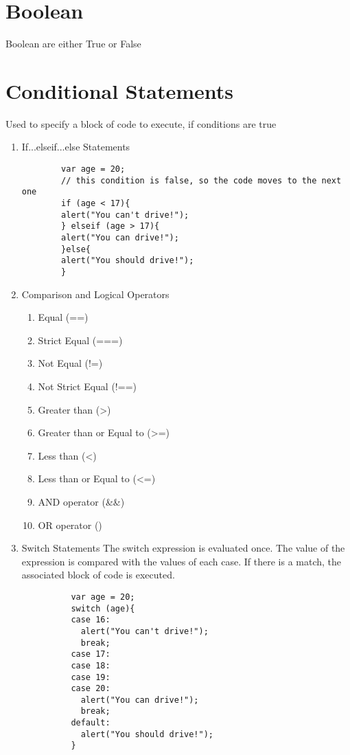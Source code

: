 \documentclass{article}
\begin{document}
  \section{Boolean}
  Boolean are either True or False
  \section{Conditional Statements}
  Used to specify a block of code to execute, if conditions are true
    \begin{enumerate}
      \item If...elseif...else Statements
      \begin{lstlisting}
        var age = 20;
        // this condition is false, so the code moves to the next one
        if (age < 17){
        alert("You can't drive!");
        } elseif (age > 17){
        alert("You can drive!");
        }else{
        alert("You should drive!");
        }
      \end{lstlisting}
      \item Comparison and Logical Operators
      \begin{enumerate}
        \item Equal (==)
        \item Strict Equal (===)
        \item Not Equal (!=)
        \item Not Strict Equal (!==)
        \item Greater than (\textgreater)
        \item Greater than or Equal to (\textgreater=)
        \item Less than (\textless)
        \item Less than or Equal to (\textless=)
        \item AND operator ({\&}{\&})
        \item OR operator (\textbar\textbar)
      \end{enumerate}
      \item Switch Statements
      The switch expression is evaluated once. The value of the expression is compared with the values of each case. If there is a match, the associated block of code is executed.
        \begin{lstlisting}
          var age = 20;
          switch (age){
          case 16:
            alert("You can't drive!");
            break;
          case 17:
          case 18:
          case 19:
          case 20:
            alert("You can drive!");
            break;
          default:
            alert("You should drive!");
          }
        \end{lstlisting}
    \end{enumerate}
\end{document}
